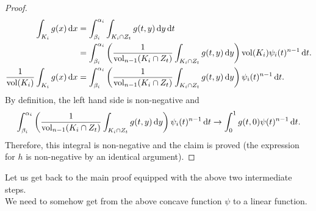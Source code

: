 \begin{proof}
	\begin{align*}
		\int_{K_i} g(x)\d{x} &= \int_{\beta_i}^{\alpha_i} \int_{K_i\cap Z_t} g(t,y)\d{y}\d{t} \\
			&= \int_{\beta_i}^{\alpha_i} \left( \frac{1}{\vol_{n-1}(K_i\cap Z_t)} \int_{K_i\cap Z_t} g(t,y)\d{y} \right) \vol(K_i) \psi_i(t)^{n-1} \d{t}. \\
		\frac{1}{\vol(K_i)}\int_{K_i} g(x)\d{x} &= \int_{\beta_i}^{\alpha_i} \left( \frac{1}{\vol_{n-1}(K_i\cap Z_t)} \int_{K_i\cap Z_t} g(t,y)\d{y} \right) \psi_i(t)^{n-1} \d{t}.
	\end{align*}
	By definition, the left hand side is non-negative and
	\[ \int_{\beta_i}^{\alpha_i} \left( \frac{1}{\operatorname{vol}_{n-1}(K_i\cap Z_t)} \int_{K_i\cap Z_t} g(t,y)\operatorname{d}\!{y} \right) \psi_i(t)^{n-1} \operatorname{d}\!{t} \to \int_0^1 g(t,0)\psi(t)^{n-1}\operatorname{d}\!{t}. \]
	Therefore, this integral is non-negative and the claim is proved (the expression for $h$ is non-negative by an identical argument).
\end{proof}

Let us get back to the main proof equipped with the above two intermediate steps.\\
We need to somehow get from the above concave function $\psi$ to a linear function.

